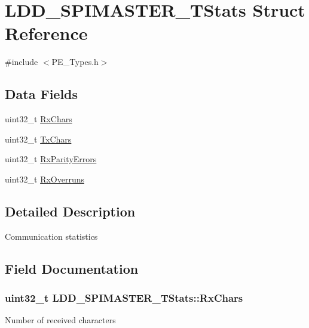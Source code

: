 \hypertarget{struct_l_d_d___s_p_i_m_a_s_t_e_r___t_stats}{}\section{L\+D\+D\+\_\+\+S\+P\+I\+M\+A\+S\+T\+E\+R\+\_\+\+T\+Stats Struct Reference}
\label{struct_l_d_d___s_p_i_m_a_s_t_e_r___t_stats}


{\ttfamily \#include $<$P\+E\+\_\+\+Types.\+h$>$}

\subsection*{Data Fields}
\begin{DoxyCompactItemize}
\item 
uint32\+\_\+t \hyperlink{struct_l_d_d___s_p_i_m_a_s_t_e_r___t_stats_a6faa4c57f364f06f5cd3770a7686ef6f}{Rx\+Chars}
\item 
uint32\+\_\+t \hyperlink{struct_l_d_d___s_p_i_m_a_s_t_e_r___t_stats_af5376883e99d71f857999d58b2888f95}{Tx\+Chars}
\item 
uint32\+\_\+t \hyperlink{struct_l_d_d___s_p_i_m_a_s_t_e_r___t_stats_a83f9f4b7598e6d84e6842539cc54619f}{Rx\+Parity\+Errors}
\item 
uint32\+\_\+t \hyperlink{struct_l_d_d___s_p_i_m_a_s_t_e_r___t_stats_a528cf1d78c49b42ae455ba895987ece5}{Rx\+Overruns}
\end{DoxyCompactItemize}


\subsection{Detailed Description}
Communication statistics 

\subsection{Field Documentation}
\hypertarget{struct_l_d_d___s_p_i_m_a_s_t_e_r___t_stats_a6faa4c57f364f06f5cd3770a7686ef6f}{}
\subsubsection[{Rx\+Chars}]{\setlength{\rightskip}{0pt plus 5cm}uint32\+\_\+t L\+D\+D\+\_\+\+S\+P\+I\+M\+A\+S\+T\+E\+R\+\_\+\+T\+Stats\+::\+Rx\+Chars}\label{struct_l_d_d___s_p_i_m_a_s_t_e_r___t_stats_a6faa4c57f364f06f5cd3770a7686ef6f}
Number of received characters \hypertarget{struct_l_d_d___s_p_i_m_a_s_t_e_r___t_stats_a528cf1d78c49b42ae455ba895987ece5}{}
